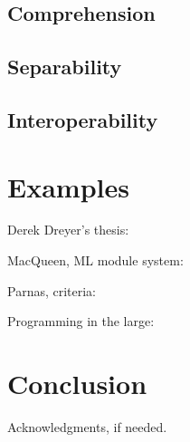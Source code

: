 \documentclass{sigplanconf}[10pt]
\begin{document}
\subsection{Comprehension}

\subsection{Separability}

\subsection{Interoperability}

\section{Examples}

Derek Dreyer's thesis:
~\cite{dreyer2005understanding}

MacQueen, ML module system:
~\cite{macqueen1984modules}

Parnas, criteria:
~\cite{parnas1972criteria}

Programming in the large:
~\cite{deremer1976programming}

\section{Conclusion}


\acks

Acknowledgments, if needed.




\end{document}
